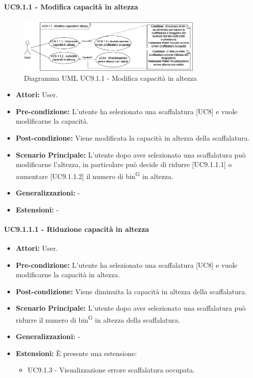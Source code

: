 \paragraph{UC9.1.1 - Modifica capacità in altezza}
\begin{figure}[H]
  \centering
  \includegraphics[width=0.8\textwidth]{UC_diagrams_1-10/UC9.1.1.drawio.png}
   \caption{Diagramma UML UC9.1.1 - Modifica capacità in altezza}
\end{figure}
\begin{itemize}
    \item \textbf{Attori:} User.
    \item \textbf{Pre-condizione:} L'utente ha selezionato una scaffalatura [UC8] e vuole modificarne la capacità.
    \item \textbf{Post-condizione:} Viene modificata la capacità in altezza della scaffalatura.
    \item \textbf{Scenario Principale:} L'utente dopo aver selezionato una scaffalatura può modificarne l'altezza, in particolare può decide di ridurre [UC9.1.1.1] o aumentare [UC9.1.1.2] il numero di bin\textsuperscript{G} in altezza.
    \item \textbf{Generalizzazioni:} -
    \item \textbf{Estensioni:} -
\end{itemize}


\paragraph{UC9.1.1.1 - Riduzione capacità in altezza}
\begin{itemize}
    \item \textbf{Attori:} User.
    \item \textbf{Pre-condizione:} L'utente ha selezionato una scaffalatura [UC8] e vuole modificarne la capacità in altezza.
    \item \textbf{Post-condizione:} Viene diminuita la capacità in altezza della scaffalatura.
    \item \textbf{Scenario Principale:} L'utente dopo aver selezionato una scaffalatura può ridurre il numero di bin\textsuperscript{G} in altezza della scaffalatura.
    \item \textbf{Generalizzazioni:} -
    \item \textbf{Estensioni:} È presente una estensione:
    \begin{itemize}
        \item UC9.1.3 - Visualizzazione errore scaffalatura occupata.
    \end{itemize}
\end{itemize}


